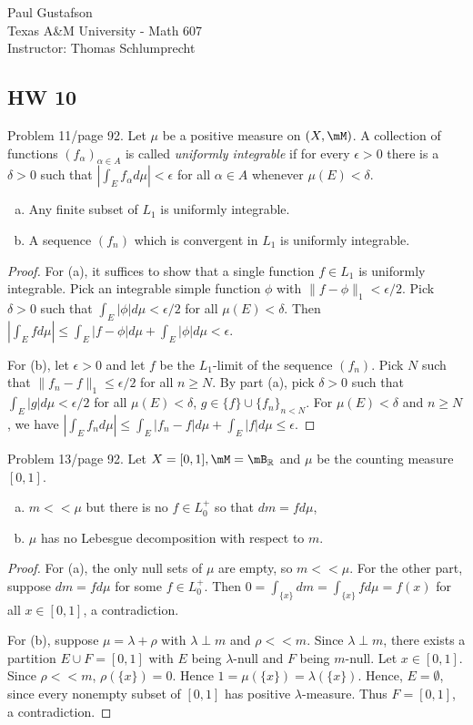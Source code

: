 \documentclass{article}
\begin{document}
\noindent Paul Gustafson\\
\noindent Texas A\&M University - Math 607\\ 
\noindent Instructor: Thomas Schlumprecht


\nc{\E}{\EE}

\subsection*{HW 10}
  Problem 11/page 92. Let $\mu$ be a positive measure on $(X, \mM)$. A collection of functions $(f_\alpha)_{\alpha \in A}$ is called \emph{uniformly integrable} if for every $\epsilon > 0$ there is a $\delta > 0$ such that $\left| \int_E f_\alpha d\mu \right| < \epsilon$ for all $\alpha \in A$ whenever $\mu(E) < \delta$.
\begin{enumerate}[a)]
\item Any finite subset of $L_1$ is uniformly integrable.
\item A sequence $(f_n)$ which is convergent in $L_1$ is uniformly integrable.
\end{enumerate}
\begin{proof}
For (a), it suffices to show that a single function $f \in L_1$ is uniformly integrable.  Pick an integrable simple function $\phi$ with
 $\|f - \phi\|_1 < \epsilon/2$.  Pick $\delta > 0$ such that $\int_E |\phi| d\mu < \epsilon/2$ for all $\mu(E) < \delta$.  
Then $\left| \int_E f d\mu \right| \le \int_E |f - \phi| d\mu + \int_E |\phi| d\mu < \epsilon$.

For (b), let $\epsilon > 0$ and let $f$ be the $L_1$-limit of the sequence $(f_n)$.  Pick $N$ such that $\| f_n - f \|_1 \le \epsilon/2$ for all $n \ge N$.  By part (a), pick $\delta >0$ such that $\int_E |g| d\mu  < \epsilon/2$ for all $\mu(E) < \delta$, $g \in \{f\} \cup \{f_n\}_{n < N}$.  
For $\mu(E) < \delta$ and $n \ge N$, we have 
$\left| \int_E f_n d\mu \right| \le \int_E |f_n -f| d\mu + \int_E |f| d\mu \le \epsilon$.
\end{proof}

 Problem 13/page 92.  Let $X = [0,1], \mM = \mB_\R$ and $\mu$ be the counting measure $[0,1]$.
\begin{enumerate}[a)]
\item $m << \mu$ but there is no $f \in L_0^+$ so that $dm = f d\mu$,
\item $\mu$ has no Lebesgue decomposition with respect to $m$.
\end{enumerate}
\begin{proof}
For (a), the only null sets of $\mu$ are empty, so $m << \mu$.  For the other part, suppose $dm = f d\mu$ for some $f \in L_0^+$.  Then $0 = \int_{\{x\}} dm = \int_{\{x\}} f d\mu = f(x)$ for all $x \in [0,1]$, a contradiction.

For (b), suppose $\mu = \lambda + \rho$ with $\lambda \perp m$ and $\rho << m$. Since $\lambda \perp m$, there exists a  partition $E \cup F = [0,1]$ with $E$ being $\lambda$-null and $F$ being $m$-null.  Let $x \in [0,1]$.   Since $\rho << m$, $\rho(\{x\}) = 0$.  Hence $1 = \mu(\{x\}) = \lambda(\{x\})$.   Hence, $E = \emptyset$, since every nonempty subset of $[0,1]$ has positive $\lambda$-measure.  Thus $F = [0,1]$, a contradiction.
\end{proof}
\end{document}
